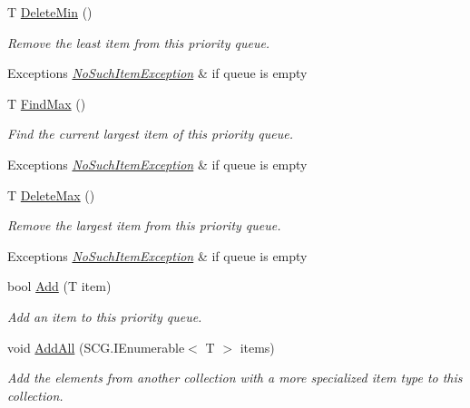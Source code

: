 \begin{DoxyCompactItemize}
T \hyperlink{class_c5_1_1_interval_heap_a63772295b880e38f9ef5c2469a687770}{Delete\+Min} ()
\begin{DoxyCompactList}\small\item\em Remove the least item from this priority queue. 
\begin{DoxyExceptions}{Exceptions}
{\em \hyperlink{class_c5_1_1_no_such_item_exception}{No\+Such\+Item\+Exception}} & if queue is empty \\
\hline
\end{DoxyExceptions}
\end{DoxyCompactList}\item 
T \hyperlink{class_c5_1_1_interval_heap_abda450e3da23bc35d0db7f4f0dd91d00}{Find\+Max} ()
\begin{DoxyCompactList}\small\item\em Find the current largest item of this priority queue. 
\begin{DoxyExceptions}{Exceptions}
{\em \hyperlink{class_c5_1_1_no_such_item_exception}{No\+Such\+Item\+Exception}} & if queue is empty \\
\hline
\end{DoxyExceptions}
\end{DoxyCompactList}\item 
T \hyperlink{class_c5_1_1_interval_heap_a487241b83be6837692408542c7cfb6b5}{Delete\+Max} ()
\begin{DoxyCompactList}\small\item\em Remove the largest item from this priority queue. 
\begin{DoxyExceptions}{Exceptions}
{\em \hyperlink{class_c5_1_1_no_such_item_exception}{No\+Such\+Item\+Exception}} & if queue is empty \\
\hline
\end{DoxyExceptions}
\end{DoxyCompactList}\item 
bool \hyperlink{class_c5_1_1_interval_heap_ab7c3c348aa1f0f2723dd0a533e1c458f}{Add} (T item)
\begin{DoxyCompactList}\small\item\em Add an item to this priority queue. \end{DoxyCompactList}\item 
void \hyperlink{class_c5_1_1_interval_heap_abe5fb2f06b082e4fec00dc454cd31ed8}{Add\+All} (S\+C\+G.\+I\+Enumerable$<$ T $>$ items)
\begin{DoxyCompactList}\small\item\em Add the elements from another collection with a more specialized item type to this collection. \end{DoxyCompactList}\item 

\end{DoxyCompactItemize}
